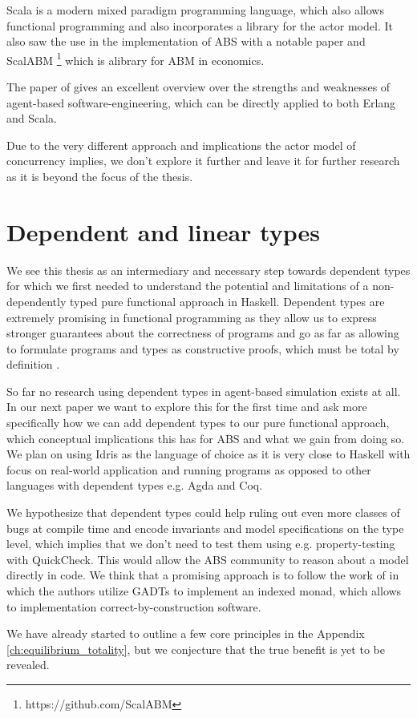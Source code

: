Scala is a modern mixed paradigm programming language, which also allows functional programming and also incorporates a library for the actor model. It also saw the use in the implementation of ABS with a notable paper \cite{krzywicki_massively_2015} and ScalABM \footnote{https://github.com/ScalABM} which is alibrary for ABM in economics.

The paper of \cite{jennings_agent-based_2000} gives an excellent overview over the strengths and weaknesses of agent-based software-engineering, which can be directly applied to both Erlang and Scala.

Due to the very different approach and implications the actor model of concurrency implies, we don't explore it further and leave it for further research as it is beyond the focus of the thesis.

\section{Dependent and linear types}
We see this thesis as an intermediary and necessary step towards dependent types for which we first needed to understand the potential and limitations of a non-dependently typed pure functional approach in Haskell. Dependent types are extremely promising in functional programming as they allow us to express stronger guarantees about the correctness of programs and go as far as allowing to formulate programs and types as constructive proofs, which must be total by definition \cite{thompson_type_1991, mckinna_why_2006, altenkirch_pi_2010}.

So far no research using dependent types in agent-based simulation exists at all. In our next paper we want to explore this for the first time and ask more specifically how we can add dependent types to our pure functional approach, which conceptual implications this has for ABS and what we gain from doing so. We plan on using Idris \cite{brady_idris_2013} as the language of choice as it is very close to Haskell with focus on real-world application and running programs as opposed to other languages with dependent types e.g. Agda and Coq.

We hypothesize that dependent types could help ruling out even more classes of bugs at compile time and encode invariants and model specifications on the type level, which implies that we don't need to test them using e.g. property-testing with QuickCheck. This would allow the ABS community to reason about a model directly in code. We think that a promising approach is to follow the work of \cite{brady_programming_2013, fowler_dependent_2014, brady_state_2016} in which the authors utilize GADTs to implement an indexed monad, which allows to implementation correct-by-construction software.

We have already started to outline a few core principles in the Appendix \ref{ch:equilibrium_totality}, but we conjecture that the true benefit is yet to be revealed.